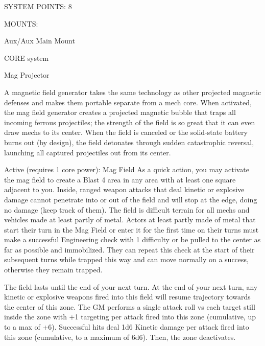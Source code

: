                                             SYSTEM POINTS: 8 

                                                 MOUNTS: 

 Aux/Aux                                             Main Mount 

                                               CORE system 

                                                                                                           


                                                     Mag Projector   

 A magnetic field generator takes the same technology as other projected magnetic defenses and makes  
  them portable separate from a mech core. When activated, the mag field generator creates a projected  
 magnetic bubble that traps all incoming ferrous projectiles; the strength of the field is so great that it can  
 even draw mechs to its center. When the field is canceled or the solid-state battery burns out (by  
 design), the field detonates through sudden catastrophic reversal, launching all captured projectiles out  
 from its center.   

 Active (requires 1 core power): Mag Field  
 As a quick action, you may activate the mag field to create a Blast 4 area in any area with at least one  
  square adjacent to you. Inside, ranged weapon attacks that deal kinetic or explosive damage cannot  
  penetrate into or out of the field and will stop at the edge, doing no damage (keep track of them). The  
 field is difficult terrain for all mechs and vehicles made at least partly of metal. Actors at least partly  
  made of metal that start their turn in the Mag Field or enter it for the first time on their turns must make  
  a successful Engineering check with 1 difficulty or be pulled to the center as far as possible and  
  immobilized. They can repeat this check at the start of their subsequent turns while trapped this way  
  and can move normally on a success, otherwise they remain trapped. 
 
 The field lasts until the end of your next turn. At the end of your next turn, any kinetic or explosive  
 weapons fired into this field will resume trajectory towards the center of this zone. The GM performs a  
  single attack roll vs each target still inside the zone with +1 targeting per attack fired into this zone  
  (cumulative, up to a max of +6). Successful hits deal 1d6 Kinetic damage per attack fired into this zone  
  (cumulative, to a maximum of 6d6). Then, the zone deactivates. 

